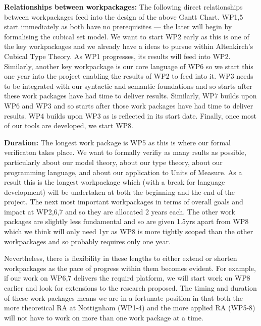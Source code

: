 \documentclass[a4paper,11pt]{article}
\begin{document}
\bigskip

{\bf Relationships between workpackages:} The following direct
relationships between workpackages feed into the design of the above
Gantt Chart. WP1,5 start immediately as both have no prerequisites ---
the later will begin by formalising the cubical set model. We want to
start WP2 early as this is one of the key workpackages and we already
have a ideas to pursue within Altenkirch's Cubical Type Theory. As WP1
progresses, its results will feed into WP2. Similarly, another key
workpackage is our core language of WP6 so we start this one year into
the project enabling the results of WP2 to feed into it. WP3 needs to
be integrated with our syntactic and semantic foundations and so
starts after these work packages have had time to deliver
results. Similarly, WP7 builds upon WP6 and WP3 and so starts after
those work packages have had time to deliver results. WP4 builds upon
WP3 as is reflected in its start date. Finally, once most of our tools
are developed, we start WP8.

{\bf Duration:} The longest work package is WP5 as this is where our
formal verificaton takes place. We want to formally verifiy as many
rsults as possible, particularly about our model theory, about our
type theory, about our programming language, and about our application
to Units of Measure. As a result this is the longest workpackage which
(with a break for language development) will be undertaken at both the
beginning and the end of the project. The next most important
workpackages in terms of overall goals and impact at WP2,6,7 and so
they are allocated 2 years each. The other work packages are slightly
less fundamental and so are given 1.5yrs apart from WP8 which we think
will only need 1yr as WP8 is more tightly scoped than the other
workpackages and so probably requires only one year.

Nevertheless, there is flexibility in these lengths to either extend
or shorten workpackages as the pace of progress within them becomes
evident. For example, if our work on WP6,7 delivers the requird
platform, we will start work on WP8 earlier and look for extensions
to the research proposed. The timing and duration of these work
packages means we are in a fortunate position in that both the more
theoretical RA at Nottignham (WP1-4) and the more applied RA (WP5-8)
will not have to work on more than one work package at a time.
\end{document}
